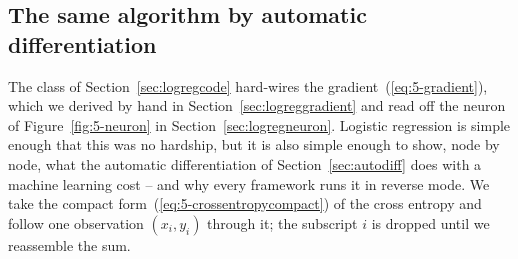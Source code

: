 \subsection{The same algorithm by automatic differentiation}
\label{sec:logregad}

The class of Section~\ref{sec:logregcode} hard-wires the
gradient~(\ref{eq:5-gradient}), which we derived by hand in
Section~\ref{sec:logreggradient} and read off the neuron of
Figure~\ref{fig:5-neuron} in Section~\ref{sec:logregneuron}.  Logistic regression is
simple enough that this was no hardship, but it is also simple enough to
show, node by node, what the automatic differentiation of
Section~\ref{sec:autodiff} does with a machine learning cost -- and why
every framework runs it in reverse mode.  We take the compact
form~(\ref{eq:5-crossentropycompact}) of the cross entropy and follow one
observation $(x_i,y_i)$ through it; the subscript $i$ is dropped until we
reassemble the sum.

